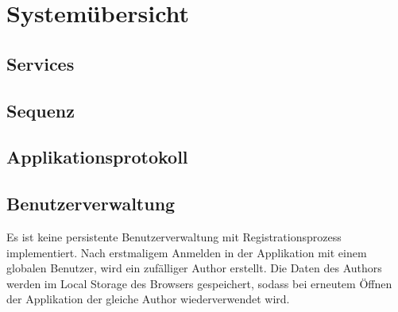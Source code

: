 \section{Systemübersicht}

\subsection{Services}

\subsection{Sequenz}

\subsection{Applikationsprotokoll}

\subsection{Benutzerverwaltung}
Es ist keine persistente Benutzerverwaltung mit Registrationsprozess implementiert.
Nach erstmaligem Anmelden in der Applikation mit einem globalen Benutzer, wird ein zufälliger Author erstellt.
Die Daten des Authors werden im Local Storage des Browsers gespeichert, sodass bei erneutem Öffnen der Applikation der gleiche Author wiederverwendet wird.
